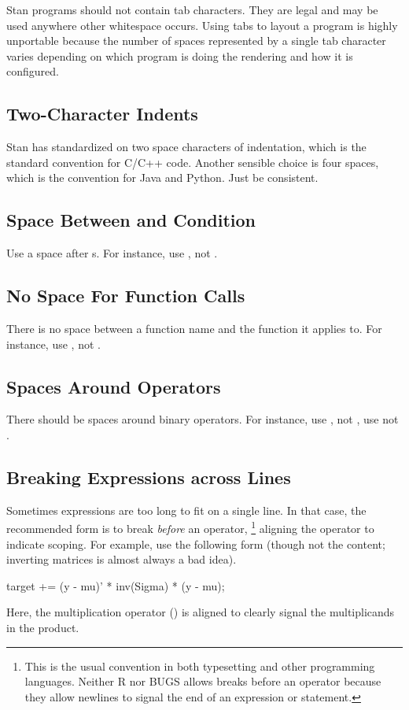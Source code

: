 Stan programs should not contain tab characters.  They are legal and
may be used anywhere other whitespace occurs.  Using tabs to layout a
program is highly unportable because the number of spaces
represented by a single tab character varies depending on which
program is doing the rendering and how it is configured.  

\subsection{Two-Character Indents}

Stan has standardized on two space characters of indentation, which is
the standard convention for C/C++ code.  Another sensible choice is
four spaces, which is the convention for Java and Python.  Just be
consistent.  

\subsection{Space Between  and Condition}

Use a space after s.  For instance, use , not
.

\subsection{No Space For Function Calls}

There is no space between a function name and the function it applies
to.  For instance, use , not .

\subsection{Spaces Around Operators}

There should be spaces around binary operators.  For instance, use
, not , use  not
.

\subsection{Breaking Expressions across Lines}

Sometimes expressions are too long to fit on a single line.  In that
case, the recommended form is to break \emph{before} an operator,%
%
\footnote{This is the usual convention in both typesetting and other
  programming languages. Neither R nor BUGS allows breaks before an
  operator because they allow newlines to signal the end of an
  expression or statement.}
%
aligning the operator to indicate scoping.  For example, use the
following form (though not the content; inverting matrices is almost
always a bad idea).
%
\begin{stancode}
target += (y - mu)' * inv(Sigma) * (y - mu);
\end{stancode}
%
Here, the multiplication operator (\code{*}) is aligned to clearly
signal the multiplicands in the product.  

